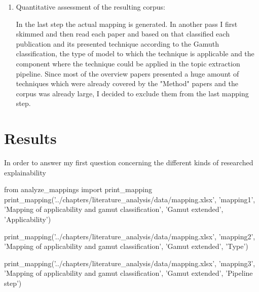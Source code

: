 \begin{enumerate}
	\item Quantitative assessment of the resulting corpus:
	
	In the last step the actual mapping is generated. In another pass I first skimmed and then read each paper and based on that classified each publication and its presented technique according to the Gamuth classification, the type of model to which the technique is applicable and the component where the technique could be applied in the topic extraction pipeline. Since most of the overview papers presented a huge amount of techniques which were already covered by the "Method" papers and the corpus was already large, I decided to exclude them from the last mapping step.

\end{enumerate}

\section{Results}

In order to answer my first question concerning the different kinds of researched explainability 

\begin{pycode}
from analyze_mappings import print_mapping
print_mapping('../chapters/literature_analysis/data/mapping.xlsx', 'mapping1', 'Mapping of applicability and gamut classification', 'Gamut extended', 'Applicability')

print_mapping('../chapters/literature_analysis/data/mapping.xlsx', 'mapping2', 'Mapping of applicability and gamut classification', 'Gamut extended', 'Type')

print_mapping('../chapters/literature_analysis/data/mapping.xlsx', 'mapping3', 'Mapping of applicability and gamut classification', 'Gamut extended', 'Pipeline step')
\end{pycode}

